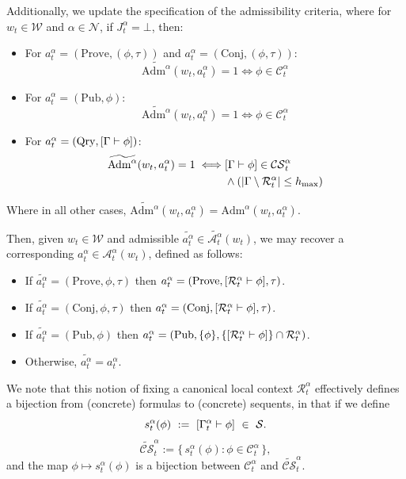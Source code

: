 Additionally, we update the specification of the admissibility criteria, where for $w_t \in \mathcal{W}$ and $\alpha \in \mathcal{N}$, if $J^\alpha_t=\bot$, then:
\begin{itemize}
\item For $a^\alpha_t = (\mathrm{Prove},(\phi,\tau))$ and $a^\alpha_t = (\mathrm{Conj},(\phi,\tau))$:
\[
\widetilde{\mathrm{Adm}^\alpha}(w_t,a^\alpha_t)=1 \iff \phi \in \mathcal{C}_t^\alpha
\]
\item For $a^\alpha_t = (\mathrm{Pub},\phi)$: \[\widetilde{\mathrm{Adm}^\alpha}(w_t,a^\alpha_t)=1 \iff \phi \in \mathcal{C}_t^\alpha\]
\item For $a^\alpha_t = (\mathrm{Qry},[\Gamma \vdash \phi])$: 
\begin{align*}
    \widetilde{\mathrm{Adm}^\alpha}(w_t,a_t^\alpha)=1 \iff &[\Gamma \vdash \phi] \in \mathcal{CS}_t^\alpha \\&\land (|\Gamma \setminus \mathcal{R}^\alpha_t| \le h_{\mathrm{max}})
\end{align*}
\end{itemize}
Where in all other cases, $\widetilde{\mathrm{Adm}^\alpha}(w_t,a_t^\alpha) =\mathrm{Adm}^\alpha(w_t,a_t^\alpha)$. 

Then, given $w_t \in \mathcal{W}$ and admissible $\widetilde{a_t^\alpha} \in \widetilde{\mathcal{A}^\alpha_t}(w_t)$, we may recover a corresponding $a_t^\alpha \in \mathcal{A}^\alpha_t(w_t)$, defined as follows:
\begin{itemize}
    \item If $\widetilde{a_t^\alpha} = (\mathrm{Prove},\phi,\tau)$ then $a_t^\alpha = (\mathrm{Prove},[\mathcal{R}_t^\alpha \vdash \phi],\tau)$.
    \item If $\widetilde{a_t^\alpha} = (\mathrm{Conj},\phi,\tau)$ then $a_t^\alpha = (\mathrm{Conj},[\mathcal{R}_t^\alpha \vdash \phi],\tau)$.
    \item If $\widetilde{a_t^\alpha} = (\mathrm{Pub},\phi)$ then $a_t^\alpha = (\mathrm{Pub},\{\phi\},\{[\mathcal{R}_t^\alpha \vdash \phi]\}\cap \mathcal{R}^\alpha_t)$.
    \item Otherwise, $\widetilde{a_t^\alpha} = a_t^\alpha$.
\end{itemize}


We note that this notion of fixing a canonical local context $\mathcal{R}_t^\alpha$ effectively defines a bijection from (concrete) formulas to (concrete) sequents, in that if we define
\[
s^\alpha_t(\phi)\ :=\ [\Gamma^\alpha_t \vdash \phi]\ \in\ \mathcal{S}.
\]
\[
\widetilde{\mathcal{CS}}^\alpha_t
:=\{\,s^\alpha_t(\phi): \phi\in\mathcal{C}^\alpha_t\,\},
\]
and the map $\phi\mapsto s^\alpha_t(\phi)$ is a bijection between $\mathcal{C}^\alpha_t$ and
$\widetilde{\mathcal{CS}}^\alpha_t$. %

